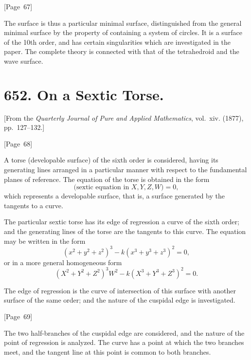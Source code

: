 \documentclass[11pt,a4paper]{article}
\theoremstyle{plain}
\theoremstyle{definition}
\theoremstyle{remark}
\begin{document}
\begin{center}
[Page~67]
\end{center}

The surface is thus a particular minimal surface, distinguished from
the general minimal surface by the property of containing a system of
circles. It is a surface of the 10th order, and has certain
singularities which are investigated in the paper. The complete theory
is connected with that of the tetrahedroid and the wave surface.


\newpage
\section*{652. On a Sextic Torse.}

[From the \textit{Quarterly Journal of Pure and Applied Mathematics},
vol.~xiv. (1877), pp.~127--132.]

\begin{center}
[Page~68]
\end{center}

A torse (developable surface) of the sixth order is considered,
having its generating lines arranged in a particular manner with
respect to the fundamental planes of reference. The equation of the
torse is obtained in the form
\[
\text{(sextic equation in } X, Y, Z, W\text{)} = 0,
\]
which represents a developable surface, that is, a surface generated by
the tangents to a curve.

The particular sextic torse has its edge of regression a curve of the
sixth order; and the generating lines of the torse are the tangents to
this curve. The equation may be written in the form
\[
(x^2 + y^2 + z^2)^3 - k(x^3 + y^3 + z^3)^2 = 0,
\]
or in a more general homogeneous form
\[
(X^2 + Y^2 + Z^2)^3W^2 - k(X^3 + Y^3 + Z^3)^2 = 0.
\]

The edge of regression is the curve of intersection of this surface
with another surface of the same order; and the nature of the
cuspidal edge is investigated.

\begin{center}
[Page~69]
\end{center}

The two half-branches of the cuspidal edge are considered, and the
nature of the point of regression is analyzed. The curve has a point
at which the two branches meet, and the tangent line at this point is
common to both branches.
\end{document}
